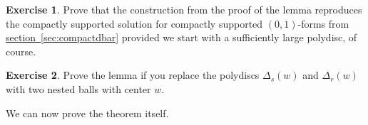 \documentclass[12pt,openany]{book}
\theoremstyle{plain}
\theoremstyle{remark}
\theoremstyle{definition}
\newenvironment{exbox}{%
    \def\FrameCommand{\vrule width 1pt \relax\hspace{10pt}}%
    \MakeFramed{\advance\hsize-\width\FrameRestore}%
}{%
    \endMakeFramed
}
\theoremstyle{exercise}
\newtheorem{exercise}{Exercise}[section]
\theoremstyle{example}
\newcommand{\sectionref}[1]{\hyperref[#1]{section~\ref*{#1}}}
\begin{document}
\begin{exbox}
\begin{exercise}
Prove that the construction from the proof of the lemma
reproduces the compactly supported
solution for compactly supported $(0,1)$-forms from \sectionref{sec:compactdbar} provided we start with a
sufficiently large polydisc, of course.
\end{exercise}

\begin{exercise} \label{exercise:dolbeaultlemmaballs}
Prove the lemma if you replace the polydiscs $\Delta_s(w)$ and $\Delta_r(w)$
with two nested balls with center $w$.
\end{exercise}
\end{exbox}

We can now prove the theorem itself.
\end{document}
